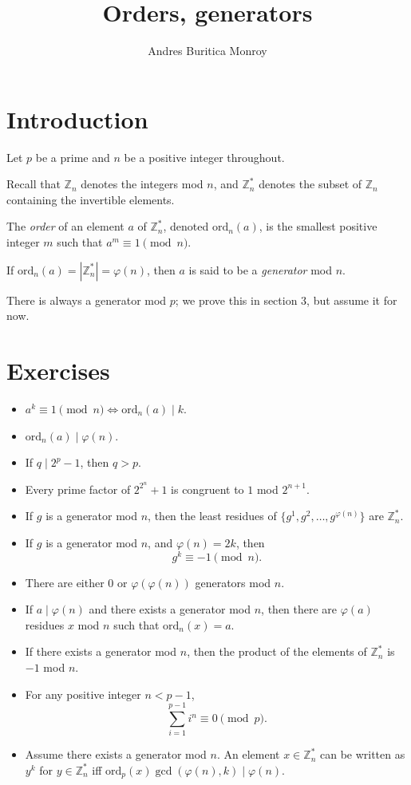 \documentclass{article}
\title{Orders, generators}
\author{Andres Buritica Monroy}
\date{}
\newcommand\Zz{\mathbb{Z}}
\newcommand\ord{\mathrm{ord}}
\begin{document}
\maketitle
\section{Introduction}
Let $p$ be a prime and $n$ be a positive integer throughout.

Recall that $\Zz_n$ denotes the integers mod $n$, and $\Zz_n^*$ denotes the
subset of $\Zz_n$ containing the invertible elements.

The \emph{order} of an element $a$ of $\Zz_n^*$, denoted $\ord_n(a)$,
is the smallest positive integer $m$ such that $a^m\equiv 1\pmod n$.

If $\ord_n(a)=|\mathbb Z_n^*|=\varphi(n)$, then $a$ is said to be a
\emph{generator} mod $n$.

There is always a generator mod $p$; we prove this in section 3, but assume it for
now.
\section{Exercises}
\begin{itemize}
	\item $a^k\equiv 1\pmod n \iff \ord_n(a)\mid k$.
	\item $\ord_n(a)\mid\varphi(n)$.
	\item If $q\mid 2^p-1$, then $q>p$.
	\item Every prime factor of $2^{2^n}+1$ is congruent to $1$ mod $2^{n+1}$.
	\item If $g$ is a generator mod $n$, then the least residues of
	      $\{g^1,g^2,\ldots,g^{\varphi(n)}\}$ are $\Zz_n^*$.
	\item If $g$ is a generator mod $n$, and $\varphi(n)=2k$, then
	      \[g^k\equiv -1\pmod n.\]
	\item There are either $0$ or $\varphi(\varphi(n))$ generators mod $n$.
	\item If $a\mid\varphi(n)$ and there exists a generator mod $n$, then
	      there are $\varphi(a)$ residues $x$ mod $n$ such that $\ord_n(x)=a$.
	\item If there exists a generator mod $n$, then the product of the elements of
	      $\Zz_n^*$ is $-1$ mod $n$.
	\item For any positive integer $n<p-1$,
	      \[\sum_{i=1}^{p-1} i^n\equiv 0\pmod p.\]
	\item Assume there exists a generator mod $n$.
	      An element $x\in\Zz_n^*$ can be written as $y^k$ for $y\in\Zz_n^*$ iff
	      $\ord_p(x)\gcd(\varphi(n),k)\mid \varphi(n)$.
\end{itemize}
\end{document}
